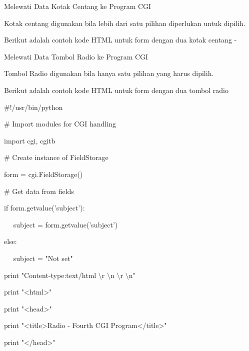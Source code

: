 \begin {enumerate}
\begin {enumerate}
\noindent
Melewati Data Kotak Centang ke Program CGI \par
\vspace{12pt}
\noindent
Kotak centang digunakan bila lebih dari satu pilihan diperlukan untuk dipilih. \par
\vspace{12pt}
\noindent
Berikut adalah contoh kode HTML untuk form dengan dua kotak centang - \par
\vspace{12pt}
\noindent
Melewati Data Tombol Radio ke Program CGI \par
\vspace{12pt}
\noindent
Tombol Radio digunakan bila hanya satu pilihan yang harus dipilih. \par
\vspace{12pt}
\noindent
Berikut adalah contoh kode HTML untuk form dengan dua tombol radio  \par
\vspace{12pt}
\vspace{12pt}
\noindent
 $  \#  $!/usr/bin/python \par
\vspace{12pt}
\noindent
 $  \#  $ Import modules for CGI handling  \par
\noindent
import cgi, cgitb  \par
\vspace{12pt}
\noindent
 $  \#  $ Create instance of FieldStorage  \par
\noindent
form = cgi.FieldStorage()  \par
\vspace{12pt}
\noindent
 $  \#  $ Get data from fields \par
\noindent
if form.getvalue('subject'): \par
\noindent
~~ subject = form.getvalue('subject') \par
\noindent
else: \par
\noindent
~~ subject = "Not set" \par
\vspace{12pt}
\noindent
print "Content-type:text/html $  \setminus  $r $  \setminus  $n $  \setminus  $r $  \setminus  $n" \par
\noindent
print "<html>" \par
\noindent
print "<head>" \par
\noindent
print "<title>Radio - Fourth CGI Program</title>" \par
\noindent
print "</head>" \par
\noindent

\end{enumerate}
\end{enumerate}
